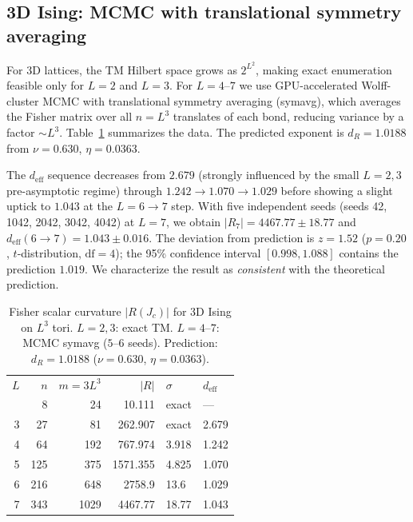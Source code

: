 \documentclass[aps,prl,twocolumn,superscriptaddress,showpacs]{revtex4-2}
\newcommand{\Scal}{R}
\newcommand{\Jc}{J_c}
\newcommand{\dR}{d_{\Scal}}
\begin{document}
\subsection{3D Ising: MCMC with translational symmetry averaging}

For 3D lattices, the TM Hilbert space grows as $2^{L^2}$, making
exact enumeration feasible only for $L = 2$ and $L = 3$. For $L = 4$--$7$
we use GPU-accelerated Wolff-cluster MCMC with translational symmetry
averaging (symavg), which averages the Fisher matrix over all $n = L^3$
translates of each bond, reducing variance by a factor $\sim L^3$.
Table~\ref{tab:ising3d} summarizes the data. The predicted exponent
is $\dR = 1.0188$ from $\nu = 0.630$, $\eta = 0.0363$.

The $d_\mathrm{eff}$ sequence decreases from $2.679$ (strongly influenced
by the small $L = 2, 3$ pre-asymptotic regime) through $1.242 \to 1.070 \to 1.029$
before showing a slight uptick to $1.043$ at the $L = 6{\to}7$ step.
With five independent seeds (seeds 42, 1042, 2042, 3042, 4042) at $L = 7$,
we obtain $|R_7| = 4467.77 \pm 18.77$ and $d_\mathrm{eff}(6{\to}7) = 1.043 \pm 0.016$.
The deviation from prediction is $z = 1.52$ ($p = 0.20$, $t$-distribution, $\mathrm{df}=4$);
the 95\% confidence interval $[0.998, 1.088]$ contains the prediction $1.019$.
We characterize the result as \emph{consistent} with the theoretical prediction.

\begin{table}[t]
\caption{\label{tab:ising3d}
  Fisher scalar curvature $|\Scal(\Jc)|$ for 3D Ising on $L^3$ tori.
  $L = 2, 3$: exact TM. $L = 4$--$7$: MCMC symavg ($5$--$6$ seeds).
  Prediction: $\dR = 1.0188$ ($\nu = 0.630$, $\eta = 0.0363$).}
\begin{ruledtabular}
\begin{tabular}{rrrrll}
  $L$ & $n$ & $m=3L^3$ & $|\Scal|$ & $\sigma$ & $d_\mathrm{eff}$ \\
  \colrule
  2 & 8   & 24   & 10.111  & exact & --- \\
  3 & 27  & 81   & 262.907 & exact & 2.679 \\
  4 & 64  & 192  & 767.974 & 3.918 & 1.242 \\
  5 & 125 & 375  & 1571.355 & 4.825 & 1.070 \\
  6 & 216 & 648  & 2758.9 & 13.6 & 1.029 \\
  7 & 343 & 1029 & 4467.77 & 18.77 & 1.043 \\
\end{tabular}
\end{ruledtabular}
\end{table}
\end{document}
